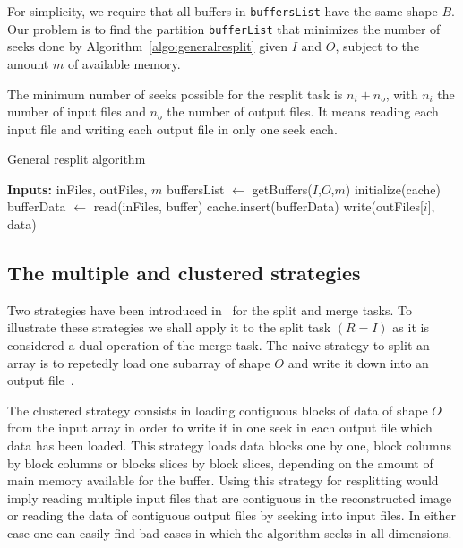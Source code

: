 \documentclass[conference]{IEEEtran}
\begin{document}
For simplicity, we require that all buffers in \texttt{buffersList} have
the same shape $B$. Our problem is to find the partition \texttt{bufferList}
that minimizes the number of seeks done by Algorithm~\ref{algo:generalresplit}
given $I$ and $O$, subject to the amount $m$ of available memory.

The minimum number of seeks possible for the resplit task is $n_i + n_o$, with
$n_i$ the number of input files and $n_o$ the number of output files. It means
reading each input file and writing each output file in only one seek each.

\begin{algorithm}[H]
  \caption{General resplit algorithm}
  \label{algo:generalresplit}
  \begin{algorithmic}
    \STATE \textbf{Inputs:} inFiles, outFiles, $m$
    \STATE buffersList $\leftarrow$ getBuffers($I$,$O$,$m$)
    \STATE initialize(cache)
      \STATE bufferData $\leftarrow$ read(inFiles, buffer)
      \STATE cache.insert(bufferData)
        \STATE write(outFiles[$i$], data)
      \ENDFOR
    \ENDFOR

  \end{algorithmic}
\end{algorithm}

\subsection{The multiple and clustered strategies}
Two strategies have been introduced in~\cite{seqalgorithms} for the split and
merge tasks. To illustrate these strategies we shall apply it to the split task
$(R = I)$ as it is considered a dual operation of the merge task. The naive
strategy to split an array is to repetedly load one subarray of shape $O$ and
write it down into an output file~\cite{seqalgorithms}.

The clustered strategy consists in loading contiguous blocks of data of shape $O$
from the input array in order to write it in one seek in each output file which
data has been loaded. This strategy loads data blocks one by one, block columns
by block columns or blocks slices by block slices, depending on the amount of
main memory available for the buffer. Using this strategy for resplitting would
imply reading multiple input files that are contiguous in the reconstructed
image or reading the data of contiguous output files by seeking into input files.
In either case one can easily find bad cases in which the algorithm seeks in all
dimensions.
\end{document}
